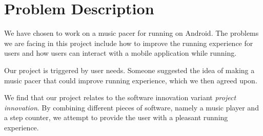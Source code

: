 \section{Problem Description}
We have chosen to work on a music pacer for running on Android. The problems we are facing in this project include how to improve the running experience for users and how users can interact with a mobile application while running. 

Our project is triggered by user needs. Someone suggested the idea of making a music pacer that could improve running experience, which we then agreed upon.


We find that our project relates to the software innovation variant \textit{project innovation}. By combining different pieces of software, namely a music player and a step counter, we attempt to provide the user with a pleasant running experience.